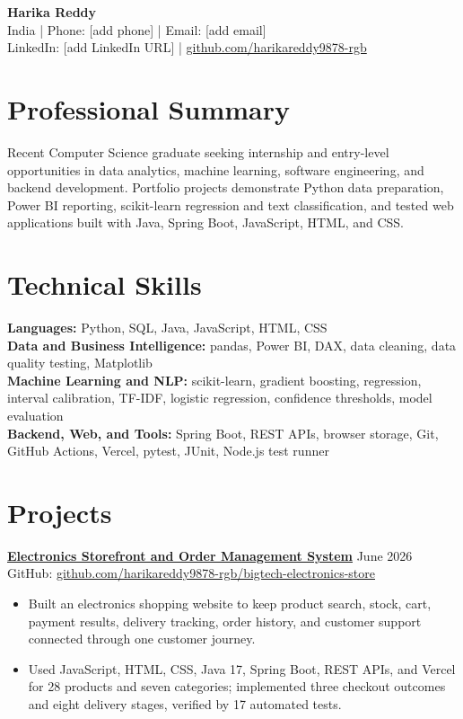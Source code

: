 \documentclass[10pt,a4paper]{article}
\newcommand{\projectheading}[4]{
  \href{#3}{\textbf{#1}} \hfill #2\\
  {\small GitHub: \href{#3}{#4}}\vspace{1pt}
}
\begin{document}
\begin{center}
  {\LARGE\bfseries Harika Reddy}\\[3pt]
  India \enspace | \enspace Phone: [add phone] \enspace | \enspace
  Email: [add email]\\
  LinkedIn: [add LinkedIn URL] \enspace | \enspace
  \href{https://github.com/harikareddy9878-rgb}{github.com/harikareddy9878-rgb}
\end{center}
\vspace{-6pt}

\section*{Professional Summary}
Recent Computer Science graduate seeking internship and entry-level opportunities in data analytics, machine learning, software engineering, and backend development. Portfolio projects demonstrate Python data preparation, Power BI reporting, scikit-learn regression and text classification, and tested web applications built with Java, Spring Boot, JavaScript, HTML, and CSS.

\section*{Technical Skills}
\textbf{Languages:} Python, SQL, Java, JavaScript, HTML, CSS\\
\textbf{Data and Business Intelligence:} pandas, Power BI, DAX, data cleaning, data quality testing, Matplotlib\\
\textbf{Machine Learning and NLP:} scikit-learn, gradient boosting, regression, interval calibration, TF-IDF, logistic regression, confidence thresholds, model evaluation\\
\textbf{Backend, Web, and Tools:} Spring Boot, REST APIs, browser storage, Git, GitHub Actions, Vercel, pytest, JUnit, Node.js test runner

\section*{Projects}

\projectheading{Electronics Storefront and Order Management System}{June 2026}{https://github.com/harikareddy9878-rgb/bigtech-electronics-store}{github.com/harikareddy9878-rgb/bigtech-electronics-store}
\begin{itemize}
  \item Built an electronics shopping website to keep product search, stock, cart, payment results, delivery tracking, order history, and customer support connected through one customer journey.
  \item Used JavaScript, HTML, CSS, Java 17, Spring Boot, REST APIs, and Vercel for 28 products and seven categories; implemented three checkout outcomes and eight delivery stages, verified by 17 automated tests.
\end{itemize}
\end{document}
